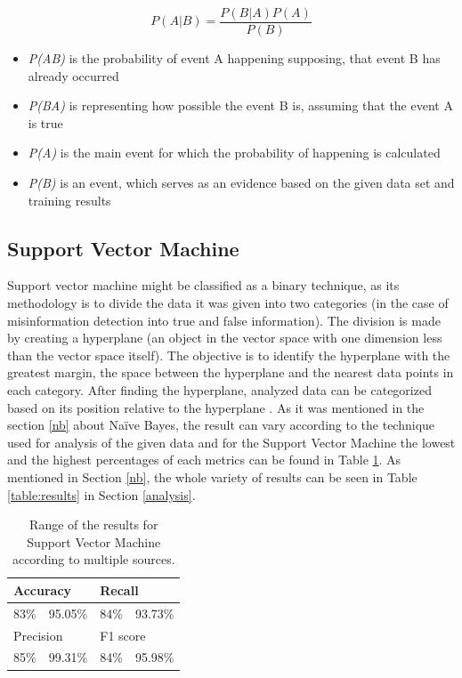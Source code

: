\documentclass[11pt ,english,a4paper]{article}
\begin{document}
\begin{equation}
P(A|B) = \frac{P(B|A)P(A)}{P(B)}
\end{equation}

\begin{itemize}[itemsep=-5pt]
\item \emph{P(A\textbar B)} is the probability of event A happening supposing, that event B has already occurred \cite{jo03bayes}
\item \emph{P(B\textbar A)} is representing how possible the event B is, assuming that the event A is true \cite{jo03bayes}
\item \emph{P(A)} is the main event for which the probability of happening is calculated \cite{jo03bayes}
\item \emph{P(B)} is an event, which serves as an evidence based on the given data set and training results \cite{jo03bayes}
\end{itemize}

\subsection{Support Vector Machine}\label{svm}
Support vector machine might be classified as a binary technique, as its methodology is to divide the data it was given into two categories \cite{pod19mach} (in the case of misinformation detection into true and false information). The division is made by creating a hyperplane (an object in the vector space with one dimension less than the vector space itself). The objective is to identify the hyperplane with the greatest margin, the space between the hyperplane and the nearest data points in each category. After finding the hyperplane, analyzed data can be categorized based on its position relative to the hyperplane \cite{sha20mach}.
As it was mentioned in the section \ref{nb} about Naïve Bayes, the result can vary according to the technique used for analysis of the given data and for the Support Vector Machine the lowest and the highest percentages of each metrics can be found in Table \ref{table:svm}. As mentioned in Section \ref{nb}, the whole variety of results can be seen in Table \ref{table:results} in Section \ref{analysis}.

\begin{table}[H]
\centering
\begin{tabular}{|ll|ll|}
\hline
\multicolumn{2}{|l|}{Accuracy}           & \multicolumn{2}{l|}{Recall}      \\ \hline
\multicolumn{1}{|l|}{83\%\cite{chap22unmask}} & 95.05\%\cite{sha20mach} & \multicolumn{1}{l|}{84\%\cite{chap22unmask}} & 93.73\%\cite{sha20mach} \\ \hline
\multicolumn{2}{|l|}{Precision}      & \multicolumn{2}{l|}{F1 score}          \\ \hline
\multicolumn{1}{|l|}{85\%\cite{chap22unmask}} & 99.31\%\cite{bar21health} & \multicolumn{1}{l|}{84\%\cite{chap22unmask}} & 95.98\%\cite{bar21health} \\ \hline
\end{tabular}
\caption{\centering Range of the results for Support Vector Machine according to multiple sources.}
\label{table:svm}
\end{table}
\end{document}
